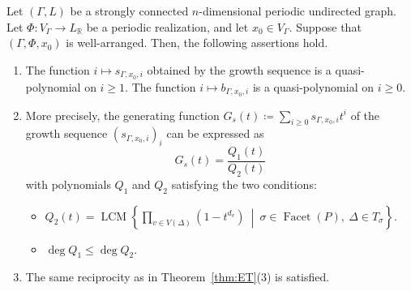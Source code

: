 \documentclass[ALCO,published]{cedram}
\theoremstyle{remark}
\begin{document}
\begin{thm}\label{thm:WA}
Let $(\Gamma , L)$ be a strongly connected $n$-dimensional periodic undirected graph. 
Let $\Phi : V_{\Gamma} \to L_{\mathbb{R}}$ be a periodic realization, and let $x_0 \in V_{\Gamma}$. 
Suppose that $(\Gamma, \Phi, x_0)$ is well-arranged. 
Then, the following assertions hold. 
\begin{enumerate}
\item 
The function $i \mapsto s_{\Gamma, x_0, i}$ obtained 
by the growth sequence is a quasi-polynomial on $i \ge 1$. 
The function $i \mapsto b_{\Gamma, x_0, i}$  is a quasi-polynomial on $i \ge 0$. 

\item
More precisely, the generating function $G_s(t) \coloneqq  \sum _{i \ge 0} s_{\Gamma, x_0, i} t^i$ of 
the growth sequence $(s_{\Gamma, x_0, i})_i$ can be expressed as
\[
G_s(t) = \frac{Q_1(t)}{Q_2(t)}
\]
with polynomials $Q_1$ and $Q_2$ satisfying the two conditions:
\begin{itemize}
\item
$Q_2(t) = \operatorname{LCM} \left \{ \prod _{v \in V(\Delta)} (1 - t^{d_v}) 
\ \middle | \ \sigma \in \operatorname{Facet}(P),\ \Delta \in T_{\sigma} \right \}$. 

\item 
$\deg Q_1 \le \deg Q_2$. 
\end{itemize}

\item
The same reciprocity as in Theorem~\ref{thm:ET}(3) is satisfied. 
\end{enumerate}
\end{thm}
\end{document}
